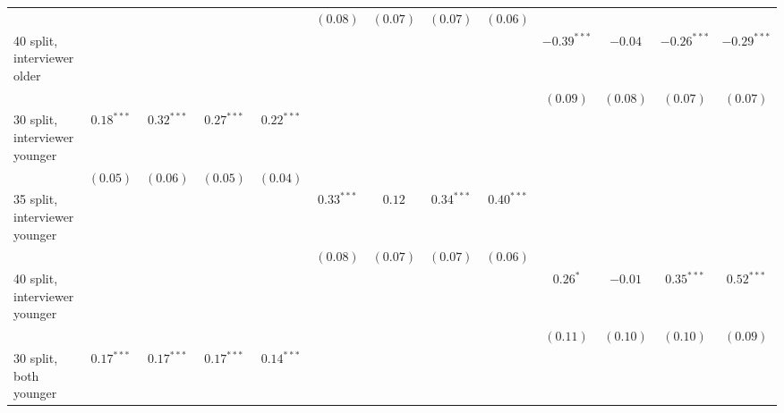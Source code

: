 \begin{table}
\begin{center}
\begin{threeparttable}
\begin{tabular}{l c c c c c c c c c c c c}
                                &               &               &               &               & $(0.08)$      & $(0.07)$      & $(0.07)$      & $(0.06)$      &               &               &               &               \\
40 split, interviewer older     &               &               &               &               &               &               &               &               & $-0.39^{***}$ & $-0.04$       & $-0.26^{***}$ & $-0.29^{***}$ \\
                                &               &               &               &               &               &               &               &               & $(0.09)$      & $(0.08)$      & $(0.07)$      & $(0.07)$      \\
30 split, interviewer younger   & $0.18^{***}$  & $0.32^{***}$  & $0.27^{***}$  & $0.22^{***}$  &               &               &               &               &               &               &               &               \\
                                & $(0.05)$      & $(0.06)$      & $(0.05)$      & $(0.04)$      &               &               &               &               &               &               &               &               \\
35 split, interviewer younger   &               &               &               &               & $0.33^{***}$  & $0.12$        & $0.34^{***}$  & $0.40^{***}$  &               &               &               &               \\
                                &               &               &               &               & $(0.08)$      & $(0.07)$      & $(0.07)$      & $(0.06)$      &               &               &               &               \\
40 split, interviewer younger   &               &               &               &               &               &               &               &               & $0.26^{*}$    & $-0.01$       & $0.35^{***}$  & $0.52^{***}$  \\
                                &               &               &               &               &               &               &               &               & $(0.11)$      & $(0.10)$      & $(0.10)$      & $(0.09)$      \\
30 split, both younger          & $0.17^{***}$  & $0.17^{***}$  & $0.17^{***}$  & $0.14^{***}$  &               &               &               &               &               &               &               &               \\

\end{tabular}
\end{threeparttable}
\end{center}
\end{table}
